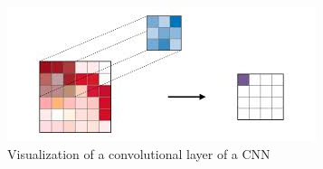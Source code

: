 \begin{figure}
    \centerline{\includegraphics[width=1\columnwidth]{03-neural-networks-in-tumor-detection/figures/cnn-convolutional-layer.jpeg}}
    \caption{Visualization of a convolutional layer of a CNN }
    \label{fig:cnn-convolutional-layer}
\end{figure}
